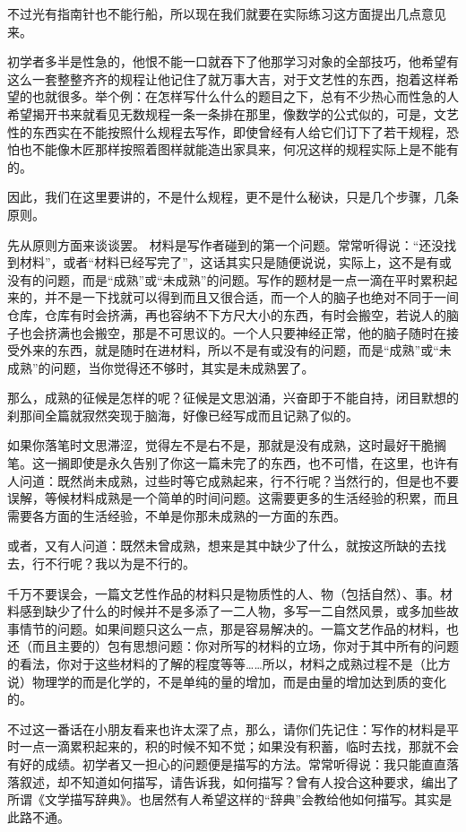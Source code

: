 \documentclass[fontset=fandol,12pt,a5paper]{ctexbook}
\begin{document}
不过光有指南针也不能行船，所以现在我们就要在实际练习这方面提出几点意见来。

初学者多半是性急的，他恨不能一口就吞下了他那学习对象的全部技巧，他希望有这么一套整整齐齐的规程让他记住了就万事大吉，对于文艺性的东西，抱着这样希望的也就很多。举个例：在怎样写什么什么的题目之下，总有不少热心而性急的人希望揭开书来就看见无数规程一条一条排在那里，像数学的公式似的，可是，文艺性的东西实在不能按照什么规程去写作，即使曾经有人给它们订下了若干规程，恐怕也不能像木匠那样按照着图样就能造出家具来，何况这样的规程实际上是不能有的。

因此，我们在这里要讲的，不是什么规程，更不是什么秘诀，只是几个步骤，几条原则。

先从原则方面来谈谈罢。
材料是写作者碰到的第一个问题。常常听得说：“还没找到材料”，或者“材料已经写完了”，这话其实只是随便说说，实际上，这不是有或没有的问题，而是“成熟”或“未成熟”的问题。写作的题材是一点一滴在平时累积起来的，并不是一下找就可以得到而且又很合适，而一个人的脑子也绝对不同于一间仓库，仓库有时会挤满，再也容纳不下方尺大小的东西，有时会搬空，若说人的脑子也会挤满也会搬空，那是不可思议的。一个人只要神经正常，他的脑子随时在接受外来的东西，就是随时在进材料，所以不是有或没有的问题，而是“成熟”或“未成熟”的问题，当你觉得还不够时，其实是未成熟罢了。

那么，成熟的征候是怎样的呢？征候是文思汹涌，兴奋即于不能自持，闭目默想的刹那间全篇就寂然突现于脑海，好像已经写成而且记熟了似的。

如果你落笔时文思滞涩，觉得左不是右不是，那就是没有成熟，这时最好干脆搁笔。这一搁即使是永久告别了你这一篇未完了的东西，也不可惜，在这里，也许有人问道：既然尚未成熟，过些时等它成熟起来，行不行呢？当然行的，但是也不要误解，等候材料成熟是一个简单的时间问题。这需要更多的生活经验的积累，而且需要各方面的生活经验，不单是你那未成熟的一方面的东西。

或者，又有人问道：既然未曾成熟，想来是其中缺少了什么，就按这所缺的去找去，行不行呢？我以为是不行的。

千万不要误会，一篇文艺性作品的材料只是物质性的人、物（包括自然）、事。材料感到缺少了什么的时候并不是多添了一二人物，多写一二自然风景，或多加些故事情节的问题。如果间题只这么一点，那是容易解决的。一篇文艺作品的材料，也还（而且主要的）包有思想问题：你对所写的材料的立场，你对于其中所有的问题的看法，你对于这些材料的了解的程度等等……所以，材料之成熟过程不是（比方说）物理学的而是化学的，不是单纯的量的增加，而是由量的增加达到质的变化的。

不过这一番话在小朋友看来也许太深了点，那么，请你们先记住：写作的材料是平时一点一滴累积起来的，积的时候不知不觉；如果没有积蓄，临时去找，那就不会有好的成绩。初学者又一担心的问题便是描写的方法。常常听得说：我只能直直落落叙述，却不知道如何描写，请告诉我，如何描写？曾有人投合这种要求，编出了所谓《文学描写辞典》。也居然有人希望这样的“辞典”会教给他如何描写。其实是此路不通。
\end{document}
